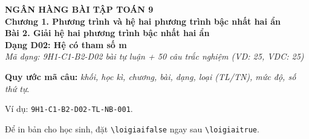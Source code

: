 \documentclass[12pt,a4paper]{article}
\newif\ifloigiai
\begin{document}
\begin{center}
{\Large\textbf{NGÂN HÀNG BÀI TẬP TOÁN 9}}\\[3pt]
\textbf{Chương 1. Phương trình và hệ hai phương trình bậc nhất hai ẩn}\\[2pt]
\textbf{Bài 2. Giải hệ hai phương trình bậc nhất hai ẩn}\\[2pt]
\textbf{Dạng D02: Hệ có tham số m}\\[2pt]
\textit{Mã dạng: 9H1-C1-B2-D02  bài tự luận + 50 câu trắc nghiệm \quad (VD: 25, VDC: 25)}
\end{center}
\textbf{Quy ước mã câu:} \textit{khối, học kì, chương, bài, dạng, loại (TL/TN), mức độ, số thứ tự}.\par Ví dụ: \texttt{9H1-C1-B2-D02-TL-NB-001}.\par Để in bản cho học sinh, đặt \verb|\loigiaifalse| ngay sau \verb|\loigiaitrue|.
\end{document}
